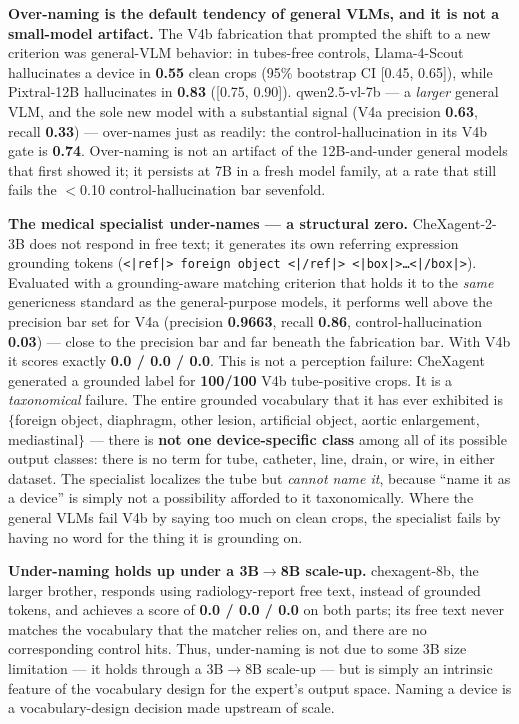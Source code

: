\documentclass{ieeeaccess}
\begin{document}
\textbf{Over-naming is the default tendency of general VLMs, and it is not a small-model artifact.} The V4b fabrication that prompted the shift to a new criterion was general-VLM behavior: in tubes-free controls, Llama-4-Scout hallucinates a device in \textbf{0.55} clean crops (95\% bootstrap CI [0.45, 0.65]), while Pixtral-12B hallucinates in \textbf{0.83} ([0.75, 0.90]). qwen2.5-vl-7b --- a \emph{larger} general VLM, and the sole new model with a substantial signal (V4a precision \textbf{0.63}, recall \textbf{0.33}) --- over-names just as readily: the control-hallucination in its V4b gate is \textbf{0.74}. Over-naming is not an artifact of the 12B-and-under general models that first showed it; it persists at 7B in a fresh model family, at a rate that still fails the $<$0.10 control-hallucination bar sevenfold.

\textbf{The medical specialist under-names --- a structural zero.} CheXagent-2-3B does not respond in free text; it generates its own referring expression grounding tokens (\texttt{<|ref|> foreign object <|/ref|> <|box|>\ldots<|/box|>}). Evaluated with a grounding-aware matching criterion that holds it to the \emph{same} genericness standard as the general-purpose models, it performs well above the precision bar set for V4a (precision \textbf{0.9663}, recall \textbf{0.86}, control-hallucination \textbf{0.03}) --- close to the precision bar and far beneath the fabrication bar. With V4b it scores exactly \textbf{0.0 / 0.0 / 0.0}. This is not a perception failure: CheXagent generated a grounded label for \textbf{100/100} V4b tube-positive crops. It is a \emph{taxonomical} failure. The entire grounded vocabulary that it has ever exhibited is $\{$foreign object, diaphragm, other lesion, artificial object, aortic enlargement, mediastinal$\}$ --- there is \textbf{not one device-specific class} among all of its possible output classes: there is no term for tube, catheter, line, drain, or wire, in either dataset. The specialist localizes the tube but \emph{cannot name it}, because ``name it as a device'' is simply not a possibility afforded to it taxonomically. Where the general VLMs fail V4b by saying too much on clean crops, the specialist fails by having no word for the thing it is grounding on.

\textbf{Under-naming holds up under a 3B$\rightarrow$8B scale-up.} chexagent-8b, the larger brother, responds using radiology-report free text, instead of grounded tokens, and achieves a score of \textbf{0.0 / 0.0 / 0.0} on both parts; its free text never matches the vocabulary that the matcher relies on, and there are no corresponding control hits. Thus, under-naming is not due to some 3B size limitation --- it holds through a 3B$\rightarrow$8B scale-up --- but is simply an intrinsic feature of the vocabulary design for the expert's output space. Naming a device is a vocabulary-design decision made upstream of scale.
\end{document}
